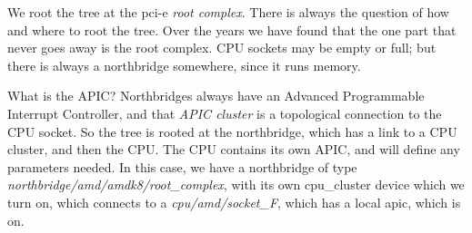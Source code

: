 \documentclass[10pt,letterpaper]{article}
\begin{document}
We root the tree at the pci-e {\it root complex}. There is always the question of how and where to root the tree. Over the years we
have found that the one part that never goes away is the root complex. CPU sockets may be empty or full; but there is always a northbridge
somewhere, since it runs memory.


What is the APIC? Northbridges always have an Advanced Programmable Interrupt Controller, and that {\it APIC cluster} is a topological connection to the
CPU socket. So the tree is rooted at the northbridge, which has a link to a CPU cluster, and then the CPU. The CPU contains
its own APIC, and will define any parameters needed. In this case, we have a northbridge of type
{\it northbridge/amd/amdk8/root\_complex}, with its own cpu\_cluster device which we turn on,
which connects to a {\it cpu/amd/socket\_F},
which has a local apic, which is on.
\end{document}
